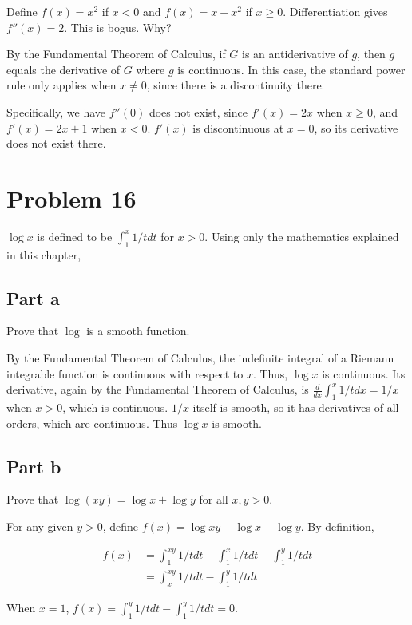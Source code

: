 \documentclass{article}
\begin{document}
Define $f(x) = x^2$ if $x < 0$ and $f(x) = x + x^2$ if $x \geq 0$. Differentiation gives $f''(x) = 2$. This is bogus. Why?

By the Fundamental Theorem of Calculus, if $G$ is an antiderivative of $g$, then $g$ equals the derivative of $G$ where $g$ is continuous. In this case, the standard power rule only applies when $x \neq 0$, since there is a discontinuity there.

Specifically, we have $f''(0)$ does not exist, since $f'(x) = 2x$ when $x \geq 0$, and $f'(x) = 2x + 1$ when $x < 0$. $f'(x)$ is discontinuous at $x=0$, so its derivative does not exist there.

\section*{Problem 16}

$\log x$ is defined to be $\int_1^x 1/t dt$ for $x > 0$. Using only the mathematics explained in this chapter,

\subsection*{Part a}

Prove that $\log$ is a smooth function.

By the Fundamental Theorem of Calculus, the indefinite integral of a Riemann integrable function is continuous with respect to $x$. Thus, $\log x$ is continuous. Its derivative, again by the Fundamental Theorem of Calculus, is $\frac{d}{dx} \int_1^x 1/t dx = 1/x$ when $x > 0$, which is continuous. $1/x$ itself is smooth, so it has derivatives of all orders, which are continuous. Thus $\log x$ is smooth.

\subsection*{Part b}

Prove that $\log(xy) = \log x + \log y$ for all $x, y > 0$.

For any given $y > 0$, define $f(x) = \log xy - \log x - \log y$. By definition,

\begin{align*}
f(x) &= \int_1^{xy} 1/t dt - \int_1^x 1/t dt - \int_1^y 1/t dt \\
&= \int_x^{xy} 1/t dt - \int_1^y 1/t dt
\end{align*}

When $x = 1$, $f(x) = \int_1^{y} 1/t dt - \int_1^{y} 1/t dt = 0$.
\end{document}

